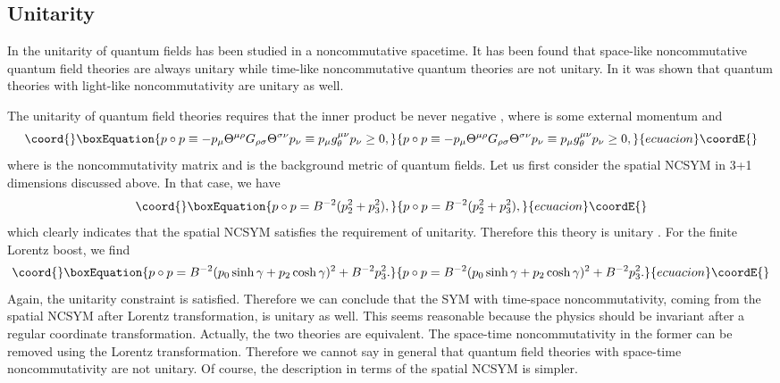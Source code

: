 \documentclass[a4paper,12pt]{article}
\begin{document}
\subsection{Unitarity}

In \cite{Gomi} the unitarity of quantum fields has been studied in
a noncommutative spacetime. It has been found that space-like
noncommutative quantum field theories are always unitary while time-like
noncommutative quantum theories are not unitary. In \cite{AGM} it was
shown that quantum theories with light-like noncommutativity are unitary
as well.

The unitarity of quantum field theories requires that the inner product
\coordHE{} be never negative \cite{Gomi,AGM}, where \coordHE{} is some external
momentum and
\begin{equation}\coord{}\boxEquation{
p \circ p \equiv -p_{\mu} \Theta^{\mu \rho} G_{\rho\sigma}\Theta^{\sigma\nu}
 p_{\nu} \equiv p_{\mu} g^{\mu\nu}_{\theta}p_{\nu} \ge 0,
}{
p \circ p \equiv -p_{\mu} \Theta^{\mu \rho} G_{\rho\sigma}\Theta^{\sigma\nu}
 p_{\nu} \equiv p_{\mu} g^{\mu\nu}_{\theta}p_{\nu} \ge 0,
}{ecuacion}\coordE{}\end{equation}
where \myHighlight{$\Theta^{\mu\nu}$}\coordHE{} is the noncommutativity matrix and \coordHE{}
is the background metric of quantum fields. Let us first consider the spatial
NCSYM in 3+1 dimensions discussed above. In that case,
we have
\begin{equation}\coord{}\boxEquation{
p \circ p = B^{-2}(p^2_2 +p_3^2),
}{
p \circ p = B^{-2}(p^2_2 +p_3^2),
}{ecuacion}\coordE{}\end{equation}
which clearly indicates that the spatial NCSYM satisfies the
requirement of unitarity. Therefore this theory is unitary \cite{Gomi}.
For the finite Lorentz boost, we find
\begin{equation}\coord{}\boxEquation{
p\circ p = B^{-2}(p_0 \sinh \gamma +p_2 \cosh\gamma)^2 + B^{-2}p_3^2.
}{
p\circ p = B^{-2}(p_0 \sinh \gamma +p_2 \cosh\gamma)^2 + B^{-2}p_3^2.
}{ecuacion}\coordE{}\end{equation}
Again, the unitarity constraint is satisfied. Therefore we can conclude that the
SYM with time-space noncommutativity, coming from the spatial
NCSYM after Lorentz transformation, is unitary as well.
This seems reasonable because the physics should be invariant after a
regular coordinate transformation. Actually, the two theories are equivalent.
The space-time noncommutativity in the former can be removed using the Lorentz
transformation. Therefore we cannot say in general that quantum field theories
with space-time noncommutativity are not unitary. Of course, the description
in terms of the spatial NCSYM is simpler.
\end{document}
